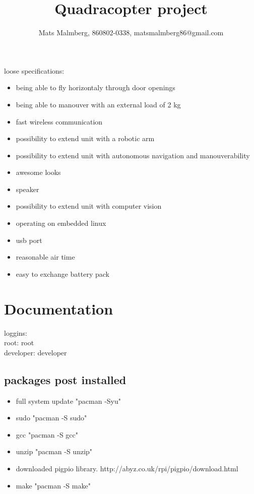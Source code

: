 \documentclass[12pt]{article}
\title{\center Quadracopter project}			%
\author{ Mats Malmberg, 860802-0338, matsmalmberg86@gmail.com}
\begin{document}
\maketitle			%

loose specifications:\\
\begin{itemize}
\item being able to fly horizontaly through door openings
\item being able to manouver with an external load of 2 kg
\item fast wireless communication
\item possibility to extend unit with a robotic arm
\item possibility to extend unit with autonomous navigation and manouverability
\item awesome looks
\item speaker
\item possibility to extend unit with computer vision
\item operating on embedded linux
\item usb port
\item reasonable air time
\item easy to exchange battery pack
\end{itemize}

\section{Documentation}
loggins: \\
root: root\\
developer: developer\\
\subsection{packages post installed}
\begin{itemize}
\item full system update "pacman -Syu"
\item sudo "pacman -S sudo"
\item gcc "pacman -S gcc"
\item unzip "pacman -S unzip"
\item downloaded pigpio library. http://abyz.co.uk/rpi/pigpio/download.html
\item make "pacman -S make"
\end{itemize}
\end{document}
